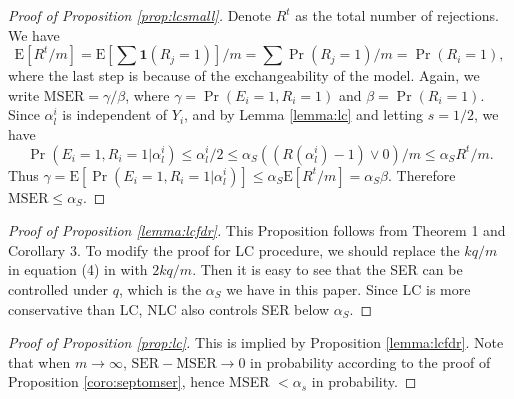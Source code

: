\documentclass[11pt]{article}
\newcommand{\Exp}[1]{{\text{E}}[ \ensuremath{ #1 } ]  }
\begin{document}




\begin{proof}[Proof of Proposition \ref{prop:lcsmall}]
 Denote $R^t$ as the total number of rejections. We have 
	\begin{equation*}
		\Exp{R^t/m} = \Exp{\sum \textbf{1}(R_j=1)}/m =\sum \Pr(R_j = 1) /m = \Pr(R_i =1),
	\end{equation*}
	where the last step is because of the exchangeability of the model. Again, we write $\text{MSER} = \gamma/\beta$, where $\gamma = \Pr(E_i = 1, R_i = 1)$ and $\beta =  \Pr(R_i = 1)$. Since $\alpha_{l}^i$ is independent of $Y_i$, and by Lemma \ref{lemma:lc} and letting $s=1/2$, we have
	\begin{equation*}
		\Pr(E_i = 1, R_i = 1 | \alpha_{l}^i) \leq  \alpha_{l}^i/2 \leq \alpha_S((R(\alpha_{l}^i)-1)\vee 0)/m \leq \alpha_S R^t/m.
	\end{equation*}
	Thus $\gamma = \Exp{\Pr(E_i = 1, R_i = 1 | \alpha_{l}^i)} \leq \alpha_S \Exp{R^t/m} =\alpha_S\beta$. Therefore $\text{MSER} \leq \alpha_S$.
\end{proof}


\begin{proof}[Proof of Proposition \ref{lemma:lcfdr}]
This Proposition follows from \citet{Benjamini2005} Theorem 1 and Corollary 3. To modify the proof for LC procedure, we should replace the $kq/m$ in equation (4) in \citet{Benjamini2005} with $2kq/m$. Then it is easy to see that the SER can be controlled under $q$, which is the $\alpha_S$ we have in this paper. Since LC is more conservative than LC, NLC also controls SER below $\alpha_S$.
\end{proof}
 
\begin{proof}[Proof of  Proposition \ref{prop:lc}]
	This is implied by  Proposition \ref{lemma:lcfdr}. Note that when $m \to \infty$, $\text{SER} - \text{MSER} \to 0$ in probability according to the proof of Proposition \ref{coro:septomser}, hence MSER $<\alpha_s$ in probability. 
\end{proof}
\end{document}
